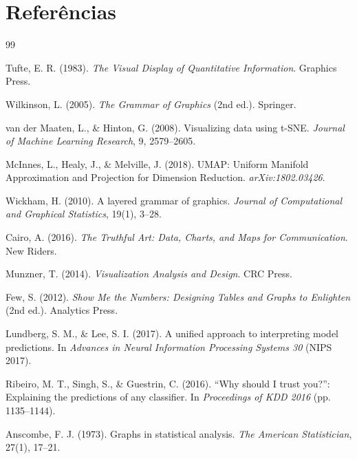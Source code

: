 \documentclass[12pt,a4paper]{article}
\begin{document}
\section{Referências}

\begin{thebibliography}{99}

 Tufte, E. R. (1983). \textit{The Visual Display of Quantitative Information}. Graphics Press.

 Wilkinson, L. (2005). \textit{The Grammar of Graphics} (2nd ed.). Springer.

 van der Maaten, L., \& Hinton, G. (2008). Visualizing data using t-SNE. \textit{Journal of Machine Learning Research}, 9, 2579--2605.

 McInnes, L., Healy, J., \& Melville, J. (2018). UMAP: Uniform Manifold Approximation and Projection for Dimension Reduction. \textit{arXiv:1802.03426}.

 Wickham, H. (2010). A layered grammar of graphics. \textit{Journal of Computational and Graphical Statistics}, 19(1), 3--28.

 Cairo, A. (2016). \textit{The Truthful Art: Data, Charts, and Maps for Communication}. New Riders.

 Munzner, T. (2014). \textit{Visualization Analysis and Design}. CRC Press.

 Few, S. (2012). \textit{Show Me the Numbers: Designing Tables and Graphs to Enlighten} (2nd ed.). Analytics Press.

 Lundberg, S. M., \& Lee, S. I. (2017). A unified approach to interpreting model predictions. In \textit{Advances in Neural Information Processing Systems 30} (NIPS 2017).

 Ribeiro, M. T., Singh, S., \& Guestrin, C. (2016). ``Why should I trust you?'': Explaining the predictions of any classifier. In \textit{Proceedings of KDD 2016} (pp. 1135--1144).

 Anscombe, F. J. (1973). Graphs in statistical analysis. \textit{The American Statistician}, 27(1), 17--21.

\end{thebibliography}
\end{document}
